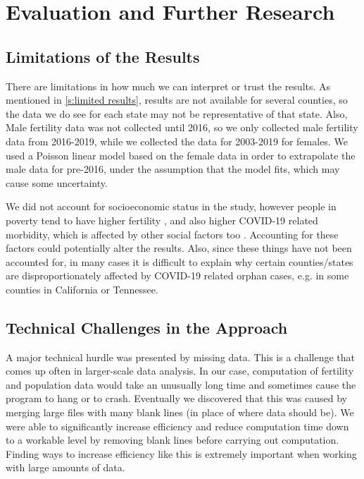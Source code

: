 \documentclass[11pt]{article}
\begin{document}
\section{Evaluation and Further Research}

\subsection{Limitations of the Results}
There are limitations in how much we can interpret or trust the results. As mentioned in \ref{s:limited results}, results are not available for several counties, so the data we do see for each state may not be representative of that state. Also, Male fertility data was not collected until 2016, so we only collected male fertility data from 2016-2019, while we collected the data for 2003-2019 for females. We used a Poisson linear model based on the female data in order to extrapolate the male data for pre-2016, under the assumption that the model fits, which may cause some uncertainty.

We did not account for socioeconomic status in the study, however people in poverty tend to have higher fertility \cite{poverty_fertility}, and also higher COVID-19 related morbidity, which is affected by other social factors too \cite{social_covid19}. Accounting for these factors could potentially alter the results. Also, since these things have not been accounted for, in many cases it is difficult to explain why certain counties/states are disproportionately affected by COVID-19 related orphan cases, e.g. in some counties in California or Tennessee.

\subsection{Technical Challenges in the Approach}

A major technical hurdle was presented by missing data. This is a challenge that comes up often in larger-scale data analysis. In our case, computation of fertility and population data would take an unusually long time and sometimes cause the program to hang or to crash. Eventually we discovered that this was caused by merging large files with many blank lines (in place of where data should be). We were able to significantly increase efficiency and reduce computation time down to a workable level by removing blank lines before carrying out computation. Finding ways to increase efficiency like this is extremely important when working with large amounts of data.
\end{document}
